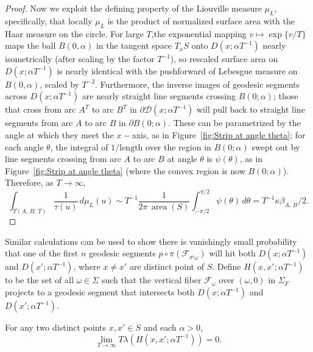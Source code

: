 \documentclass[AHL, Unicode, longabstracts, published]{cedram}
\DeclareMathOperator{\area}{area}
\begin{document}
\begin{proof}
Now we exploit the defining property of the Liouville measure $\mu_{L}$, specifically, that locally $\mu_{L}$ is the product of normalized surface area with the Haar measure on the circle. For large $T$,the exponential mapping $v\mapsto \exp \{v/T \}$ maps the ball $B(0,\alpha)$ in the tangent space $T_x S$ onto $D (x;\alpha T^{-1})$ nearly isometrically (after scaling by the factor $T^{-1}$), so rescaled surface area on $D (x;\alpha T^{-1})$ is nearly identical with the pushforward of Lebesgue measure on $B (0,\alpha)$, scaled by $T^{-2}$. Furthermore, the inverse images of geodesic segments across $D (x;\alpha T^{-1})$ are nearly straight line segments crossing $B(0;\alpha)$; those that cross from arc $A^{T}$ to arc $B^{T}$ in $\partial \mathcal{D}(x;\alpha T^{-1})$ will pull back to straight line segments from arc $A$ to arc $B$ in $\partial B (0;\alpha)$. These can be parametrized by the angle at which they meet the $x-$axis, as in Figure~\ref{fig:Strip at angle theta}; for each angle $\theta$, the integral of $1/\text{length}$ over the region in $B (0;\alpha)$ swept out by line segments crossing from arc $A$ to arc $B$ at angle $\theta$ is $\psi (\theta)$, as in Figure~\ref{fig:Strip at angle theta} (where the convex region is now $B (0;\alpha)$). Therefore, as $T \rightarrow \infty$,
\[
\int_{\Upsilon (A,\,B;\,T)} \frac{1}{\tau (u)} \,d\mu_{L} (u)\sim T^{-1}\frac{1}{2\pi\, \area (S)} \int_{-\pi /2}^{\pi /2}\psi (\theta) \,d\theta =T^{-1} \kappa \beta_{A,\,B}/2.
\]
\end{proof}



Similar calculations can be used to show there is vanishingly small probability that one of the first $n$ geodesic segments $p\circ\pi (\mathcal{F}_{\sigma^{i}\omega})$ will hit both $D(x;\alpha T^{-1})$ and $D(x';\alpha T^{-1})$, where $x\not =x'$ are distinct point of $S$. Define $H (x,x';\alpha T^{-1})$ to be the set of all $\omega \in \Sigma$ such that the vertical fiber $\mathcal{F}_{\omega}$ over $(\omega,0)$ in $\Sigma_{F}$ projects to a geodesic segment that intersects both $D(x;\alpha T^{-1})$ and $D(x';\alpha T^{-1})$.


\begin{prop}\label{proposition:double-hits}
For any two distinct points $x,x'\in S$ and each $\alpha >0$,
\[
\lim_{T \rightarrow \infty} T\lambda  \left(H \left(x,x';\alpha T^{-1}\right)\right)=0.
\]
\end{prop}
\end{document}
